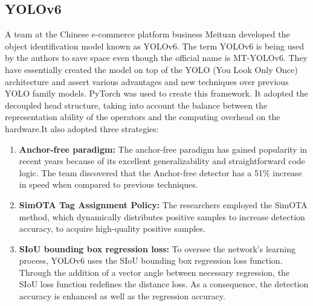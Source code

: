 \subsection{YOLOv6} A team at the Chinese e-commerce platform business Meituan developed the object identification model known as YOLOv6. The term YOLOv6 is being used by the authors to save space even though the official name is MT-YOLOv6. They have essentially created the model on top of the YOLO (You Look Only Once) architecture and assert various advantages and new techniques over previous YOLO family models. PyTorch was used to create this framework. It adopted the decoupled head structure, taking into account the balance between the representation ability of the operators and the computing overhead on the hardware.It also adopted three strategies:\\
\begin{enumerate}
    \item \textbf{Anchor-free paradigm: } The anchor-free paradigm has gained popularity in recent years because of its excellent generalizability and straightforward code logic. The team discovered that the Anchor-free detector has a 51\% increase in speed when compared to previous techniques.
    \item \textbf{SimOTA Tag Assignment Policy: }The researchers employed the SimOTA method, which dynamically distributes positive samples to increase detection accuracy, to acquire high-quality positive samples.
    \item \textbf{SIoU bounding box regression loss: }To oversee the network's learning process, YOLOv6 uses the SIoU bounding box regression loss function. Through the addition of a vector angle between necessary regression, the SIoU loss function redefines the distance loss. As a consequence, the detection accuracy is enhanced as well as the regression accuracy.
\end{enumerate}
